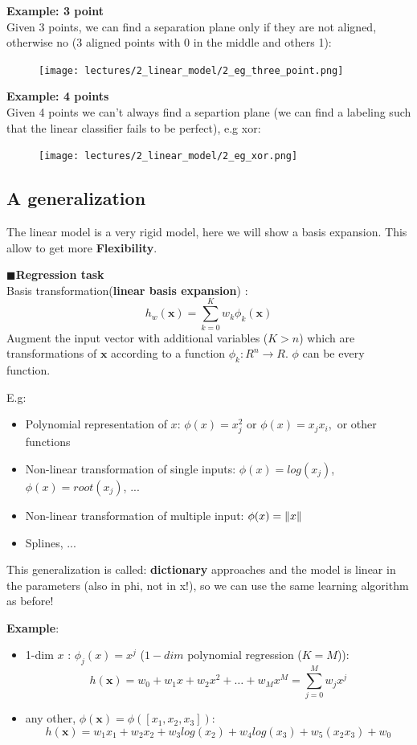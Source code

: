 \documentclass[../main.tex]{subfiles}
\begin{document}
\textbf{Example: 3 point}\\
Given 3 points, we can find a separation plane only if they are not aligned, otherwise no (3 aligned points with 0 in the middle and others 1):

\begin{figure}[H]
    \centering
    \texttt{[image: lectures/2\_linear\_model/2\_eg\_three\_point.png]}
\end{figure}

\textbf{Example: 4 points}\\
Given 4 points we can't always find a separtion plane (we can find a labeling such that the linear classifier fails to be perfect), e.g xor:
\begin{figure}[H]
    \centering
    \texttt{[image: lectures/2\_linear\_model/2\_eg\_xor.png]}
\end{figure}


\subsection{A generalization}
The linear model is a very rigid model, here we will show a basis expansion. This allow to get more \textbf{Flexibility}.

\noindent$\blacksquare$\textbf{Regression task}\\
Basis transformation(\textbf{linear basis expansion}) :
$$h_w(\mathbf{x})=\sum_{k = 0}^{K} w_k\phi_k(\mathbf{x})$$
Augment the input vector with additional variables ($K>n$) which are transformations of $\mathbf{x}$ according to a function $\phi_k: R^n\rightarrow R$. $\phi$ can be every function.

E.g:
\begin{itemize}
    \item Polynomial representation of $x$: $\phi(x) = x_j^2$ or $\phi(x) = x_jx_i,$ or other functions
    \item Non-linear transformation of single inputs: $\phi(x) = log(x_j)$, $\phi(x) = root(x_j)$, ...
    \item Non-linear transformation of multiple input: $\phi(x) = \left\lVert x\right\rVert$
    \item Splines, ...
\end{itemize}

This generalization is called: \textbf{dictionary} approaches and the model is linear in the parameters (also in phi, not in x!), so we can use the same learning algorithm as before!

\textbf{Example}:
\begin{itemize}
    \item 1-dim $x$ : $\phi_j(x) = x^j$ ($1-dim$ polynomial regression ($K=M$)):
    $$ h(\mathbf{x}) = w_0 + w_1x + w_2x^2 + \dots + w_Mx^M = \sum_{j = 0}^M w_jx^j$$
    
    \item any other, $\phi(\mathbf{x}) = \phi([x_1, x_2, x_3])$:
    $$  h(\mathbf{x}) = w_1x_1 + w_2x_2 + w_3 log(x_2)+ w_4 log(x_3) + w_5(x_2x_3) + w_0 $$
\end{itemize}
\end{document}
